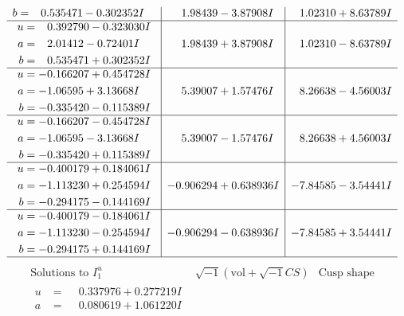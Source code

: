 \documentclass[1p]{elsarticle_modified}
\theoremstyle{definition}
\newcommand{\I}{\sqrt{-1}}
\begin{document}
$$\begin{array}{c|c|c}
\begin{aligned}
b &= \phantom{-}0.535471 - 0.302352 I\end{aligned}
 & \phantom{-}1.98439 - 3.87908 I & \phantom{-}1.02310 + 8.63789 I \\ \hline\begin{aligned}
u &= \phantom{-}0.392790 - 0.323030 I \\
a &= \phantom{-}2.01412 - 0.72401 I \\
b &= \phantom{-}0.535471 + 0.302352 I\end{aligned}
 & \phantom{-}1.98439 + 3.87908 I & \phantom{-}1.02310 - 8.63789 I \\ \hline\begin{aligned}
u &= -0.166207 + 0.454728 I \\
a &= -1.06595 + 3.13668 I \\
b &= -0.335420 - 0.115389 I\end{aligned}
 & \phantom{-}5.39007 + 1.57476 I & \phantom{-}8.26638 - 4.56003 I \\ \hline\begin{aligned}
u &= -0.166207 - 0.454728 I \\
a &= -1.06595 - 3.13668 I \\
b &= -0.335420 + 0.115389 I\end{aligned}
 & \phantom{-}5.39007 - 1.57476 I & \phantom{-}8.26638 + 4.56003 I \\ \hline\begin{aligned}
u &= -0.400179 + 0.184061 I \\
a &= -1.113230 + 0.254594 I \\
b &= -0.294175 - 0.144169 I\end{aligned}
 & -0.906294 + 0.638936 I & -7.84585 - 3.54441 I \\ \hline\begin{aligned}
u &= -0.400179 - 0.184061 I \\
a &= -1.113230 - 0.254594 I \\
b &= -0.294175 + 0.144169 I\end{aligned}
 & -0.906294 - 0.638936 I & -7.84585 + 3.54441 I\\
 \hline 
 \end{array}$$\newpage$$\begin{array}{c|c|c}  
\text{Solutions to }I^u_{1}& \I (\text{vol} + \sqrt{-1}CS) & \text{Cusp shape}\\
 \hline 
\begin{aligned}
u &= \phantom{-}0.337976 + 0.277219 I \\
a &= \phantom{-}0.080619 + 1.061220 I \\

\end{aligned}
\end{array}$$
\end{document}
